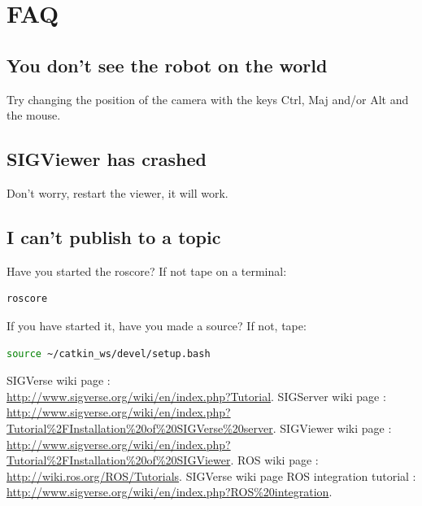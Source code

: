 \documentclass[notitlepage]{report}
\begin{document}
\chapter{FAQ}
\section*{You don't see the robot on the world}
Try changing the position of the camera with the keys Ctrl, Maj and/or Alt and the mouse.
\section*{SIGViewer has crashed}
Don't worry, restart the viewer, it will work.

\section*{I can't publish to a topic}
Have you started the roscore? If not tape on a terminal:
\begin{lstlisting}[language=bash]
roscore
\end{lstlisting} 
If you have started it, have you made a source? If not, tape:
\begin{lstlisting}[language=bash]
source ~/catkin_ws/devel/setup.bash
\end{lstlisting} 

\begin{thebibliography}{9}
          SIGVerse wiki page : \\
          \url{http://www.sigverse.org/wiki/en/index.php?Tutorial}.
          SIGServer wiki page : \\
          \url{http://www.sigverse.org/wiki/en/index.php?Tutorial%2FInstallation%20of%20SIGVerse%20server}.
          SIGViewer wiki page : \\
          \url{http://www.sigverse.org/wiki/en/index.php?Tutorial%2FInstallation%20of%20SIGViewer}.
          ROS wiki page :\\
          \url{http://wiki.ros.org/ROS/Tutorials}.
          SIGVerse wiki page ROS integration tutorial :\\
          \url{http://www.sigverse.org/wiki/en/index.php?ROS%20integration}.
     
\end{thebibliography}
\end{document}
